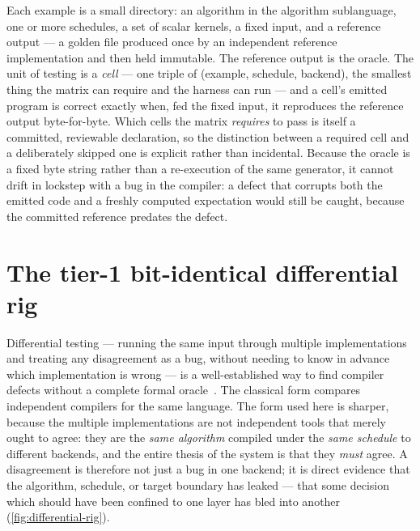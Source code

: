 Each example is a small directory: an algorithm in the algorithm sublanguage, one
or more schedules, a set of scalar kernels, a fixed input, and a reference output
--- a golden file produced once by an independent reference implementation and then
held immutable. The reference output is the oracle. The unit of testing is a
\emph{cell} --- one triple of (example, schedule, backend), the smallest thing the
matrix can require and the harness can run --- and a cell's emitted program is
correct exactly when, fed the fixed input, it reproduces the reference output
byte-for-byte. Which cells the matrix \emph{requires} to pass is itself a committed,
reviewable declaration, so the distinction between a required cell and a deliberately
skipped one is explicit rather than incidental. Because the oracle is a fixed byte string rather than a
re-execution of the same generator, it cannot drift in lockstep with a bug in the
compiler: a defect that corrupts both the emitted code and a freshly computed
expectation would still be caught, because the committed reference predates the
defect.

\section{The tier-1 bit-identical differential rig}\label{sec:val-differential}

Differential testing --- running the same input through multiple implementations
and treating any disagreement as a bug, without needing to know in advance which
implementation is wrong --- is a well-established way to find compiler defects
without a complete formal oracle~\cite{mckeeman1998differential,yang2011csmith}.
The classical form compares independent compilers for the same language. The form
used here is sharper, because the multiple implementations are not independent
tools that merely ought to agree: they are the \emph{same algorithm} compiled
under the \emph{same schedule} to different backends, and the entire thesis of the
system is that they \emph{must} agree. A disagreement is therefore not just a bug
in one backend; it is direct evidence that the algorithm, schedule, or
target boundary has leaked --- that some decision which should have been confined
to one layer has bled into another (\cref{fig:differential-rig}).



